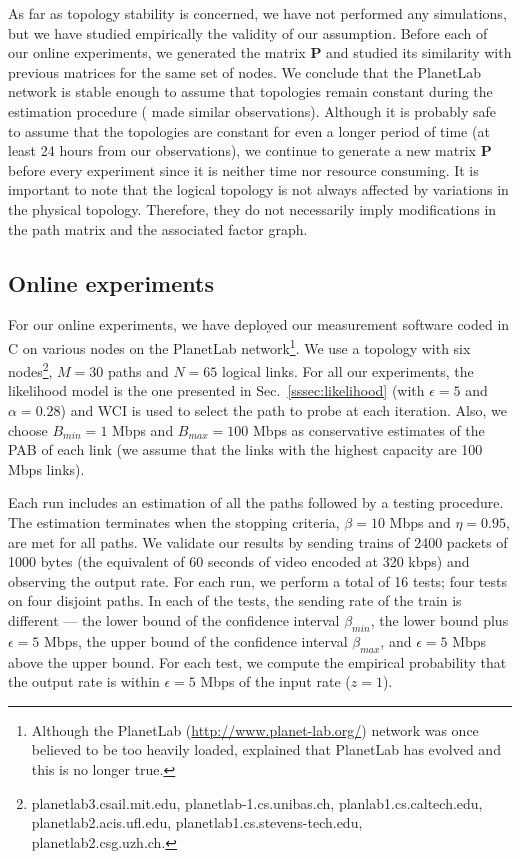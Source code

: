\documentclass[final,5p,times,twocolumn]{elsarticle}
\begin{document}
As far as topology stability is concerned, we have not performed any simulations, but we have studied empirically the validity of our assumption.  
Before each of our online experiments, we generated the matrix $\mathbf{P}$ and studied its similarity with previous matrices for the same set of nodes.
We conclude that the PlanetLab network is stable enough to assume that topologies remain constant during the estimation procedure (\citet{son:07} made similar observations).  Although it is probably safe to assume that the topologies are constant for even a longer period of time (at least 24 hours from our observations), we continue to generate a new matrix $\mathbf{P}$ before every experiment since it is neither time nor resource consuming.  It is important to note that the logical topology is not always affected by variations in the physical topology.  Therefore, they do not necessarily imply modifications in the path matrix and the associated factor graph.  

\subsection{Online experiments}
\label{ssec:exp}

For our online experiments, we have deployed our measurement software coded in C on various nodes on the PlanetLab network\footnote{Although the PlanetLab (\url{http://www.planet-lab.org/}) network was once believed to be too heavily loaded, \citet{spr:06} explained that PlanetLab has evolved and this is no longer true.}.  
We use a topology with six nodes\footnote{planetlab3.csail.mit.edu, planetlab-1.cs.unibas.ch, planlab1.cs.caltech.edu, planetlab2.acis.ufl.edu, planetlab1.cs.stevens-tech.edu, planetlab2.csg.uzh.ch.}, $M=30$ paths and $N=65$ logical links.  For all our experiments, the likelihood model is the one presented in Sec.~\ref{sssec:likelihood} (with $\epsilon=5$ and $\alpha=0.28$) and WCI is used to select the path to probe at each iteration.  Also, we choose $B_{min} = 1$ Mbps and $B_{max} = 100$ Mbps as conservative estimates of the PAB of each link (we assume that the links with the highest capacity are 100 Mbps links).

Each run includes an estimation of all the paths followed by a testing procedure.
The estimation terminates when the stopping criteria, $\beta = 10$ Mbps and $\eta = 0.95$, are met for all paths.
We validate our results by sending trains of 2400 packets of 1000 bytes (the equivalent of 60 seconds of video encoded at 320 kbps) and observing the output rate.
For each run, we perform a total of 16 tests; four tests on four disjoint paths.  In each of the tests, the sending rate of the train is different --- the lower bound of the confidence interval $\beta_{min}$, the lower bound plus $\epsilon=5$ Mbps, the upper bound of the confidence interval $\beta_{max}$, and $\epsilon=5$ Mbps above the upper bound.  For each test, we compute the empirical probability that the output rate is within $\epsilon=5$ Mbps of the input rate ($z=1$).  
\end{document}
